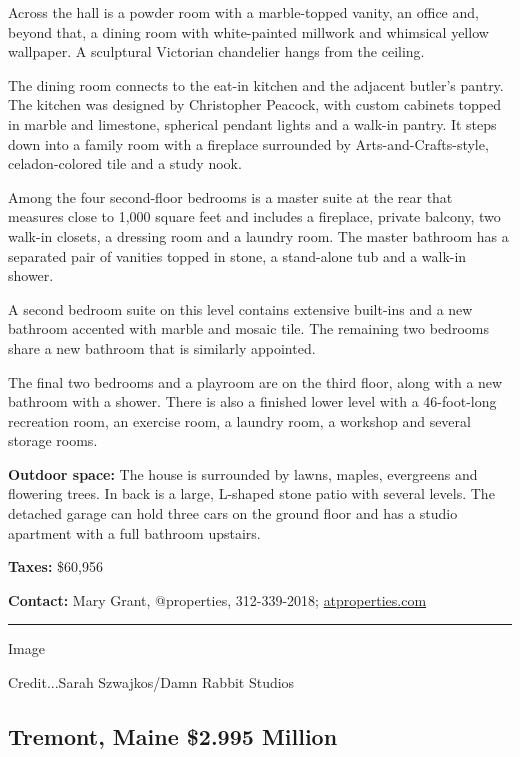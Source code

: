 Across the hall is a powder room with a marble-topped vanity, an office
and, beyond that, a dining room with white-painted millwork and
whimsical yellow wallpaper. A sculptural Victorian chandelier hangs from
the ceiling.

The dining room connects to the eat-in kitchen and the adjacent butler's
pantry. The kitchen was designed by Christopher Peacock, with custom
cabinets topped in marble and limestone, spherical pendant lights and a
walk-in pantry. It steps down into a family room with a fireplace
surrounded by Arts-and-Crafts-style, celadon-colored tile and a study
nook.

Among the four second-floor bedrooms is a master suite at the rear that
measures close to 1,000 square feet and includes a fireplace, private
balcony, two walk-in closets, a dressing room and a laundry room. The
master bathroom has a separated pair of vanities topped in stone, a
stand-alone tub and a walk-in shower.

A second bedroom suite on this level contains extensive built-ins and a
new bathroom accented with marble and mosaic tile. The remaining two
bedrooms share a new bathroom that is similarly appointed.

The final two bedrooms and a playroom are on the third floor, along with
a new bathroom with a shower. There is also a finished lower level with
a 46-foot-long recreation room, an exercise room, a laundry room, a
workshop and several storage rooms.

\textbf{Outdoor space:} The house is surrounded by lawns, maples,
evergreens and flowering trees. In back is a large, L-shaped stone patio
with several levels. The detached garage can hold three cars on the
ground floor and has a studio apartment with a full bathroom upstairs.

\textbf{Taxes:} \$60,956

\textbf{Contact:} Mary Grant, @properties, 312-339-2018;
\href{https://www.atproperties.com/10685949/612-warwick-road-kenilworth-illinois-60043-nei}{atproperties.com}

\begin{center}\rule{0.5\linewidth}{\linethickness}\end{center}

Image

Credit...Sarah Szwajkos/Damn Rabbit Studios

\hypertarget{tremont-maine--2995-million}{%
\subsection{Tremont, Maine \textbar{} \$2.995
Million}\label{tremont-maine--2995-million}}

